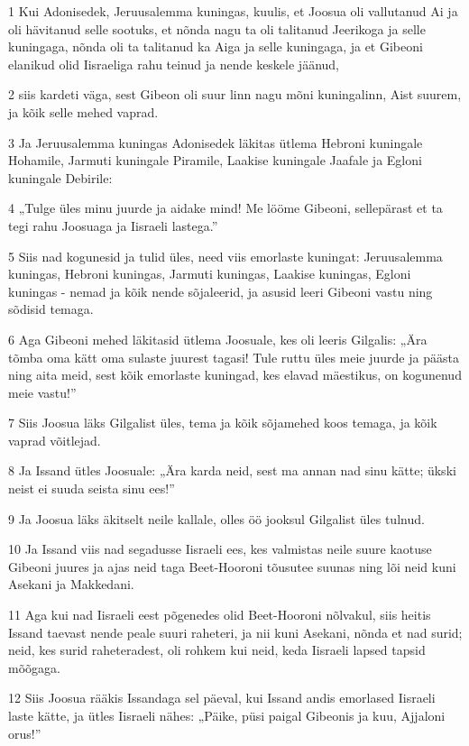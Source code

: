 \par 1 Kui Adonisedek, Jeruusalemma kuningas, kuulis, et Joosua oli vallutanud Ai ja oli hävitanud selle sootuks, et nõnda nagu ta oli talitanud Jeerikoga ja selle kuningaga, nõnda oli ta talitanud ka Aiga ja selle kuningaga, ja et Gibeoni elanikud olid Iisraeliga rahu teinud ja nende keskele jäänud,
\par 2 siis kardeti väga, sest Gibeon oli suur linn nagu mõni kuningalinn, Aist suurem, ja kõik selle mehed vaprad.
\par 3 Ja Jeruusalemma kuningas Adonisedek läkitas ütlema Hebroni kuningale Hohamile, Jarmuti kuningale Piramile, Laakise kuningale Jaafale ja Egloni kuningale Debirile:
\par 4 „Tulge üles minu juurde ja aidake mind! Me lööme Gibeoni, sellepärast et ta tegi rahu Joosuaga ja Iisraeli lastega.”
\par 5 Siis nad kogunesid ja tulid üles, need viis emorlaste kuningat: Jeruusalemma kuningas, Hebroni kuningas, Jarmuti kuningas, Laakise kuningas, Egloni kuningas - nemad ja kõik nende sõjaleerid, ja asusid leeri Gibeoni vastu ning sõdisid temaga.
\par 6 Aga Gibeoni mehed läkitasid ütlema Joosuale, kes oli leeris Gilgalis: „Ära tõmba oma kätt oma sulaste juurest tagasi! Tule ruttu üles meie juurde ja päästa ning aita meid, sest kõik emorlaste kuningad, kes elavad mäestikus, on kogunenud meie vastu!”
\par 7 Siis Joosua läks Gilgalist üles, tema ja kõik sõjamehed koos temaga, ja kõik vaprad võitlejad.
\par 8 Ja Issand ütles Joosuale: „Ära karda neid, sest ma annan nad sinu kätte; ükski neist ei suuda seista sinu ees!”
\par 9 Ja Joosua läks äkitselt neile kallale, olles öö jooksul Gilgalist üles tulnud.
\par 10 Ja Issand viis nad segadusse Iisraeli ees, kes valmistas neile suure kaotuse Gibeoni juures ja ajas neid taga Beet-Hooroni tõusutee suunas ning lõi neid kuni Asekani ja Makkedani.
\par 11 Aga kui nad Iisraeli eest põgenedes olid Beet-Hooroni nõlvakul, siis heitis Issand taevast nende peale suuri raheteri, ja nii kuni Asekani, nõnda et nad surid; neid, kes surid raheteradest, oli rohkem kui neid, keda Iisraeli lapsed tapsid mõõgaga.
\par 12 Siis Joosua rääkis Issandaga sel päeval, kui Issand andis emorlased Iisraeli laste kätte, ja ütles Iisraeli nähes: „Päike, püsi paigal Gibeonis ja kuu, Ajjaloni orus!”

